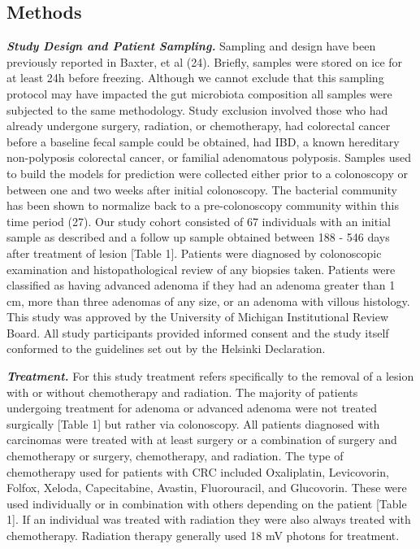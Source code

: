 \documentclass[12pt,]{article}
\begin{document}
\newpage

\subsection{Methods}\label{methods}

\textbf{\emph{Study Design and Patient Sampling.}} Sampling and design
have been previously reported in Baxter, et al (24). Briefly, samples
were stored on ice for at least 24h before freezing. Although we cannot
exclude that this sampling protocol may have impacted the gut microbiota
composition all samples were subjected to the same methodology. Study
exclusion involved those who had already undergone surgery, radiation,
or chemotherapy, had colorectal cancer before a baseline fecal sample
could be obtained, had IBD, a known hereditary non-polyposis colorectal
cancer, or familial adenomatous polyposis. Samples used to build the
models for prediction were collected either prior to a colonoscopy or
between one and two weeks after initial colonoscopy. The bacterial
community has been shown to normalize back to a pre-colonoscopy
community within this time period (27). Our study cohort consisted of 67
individuals with an initial sample as described and a follow up sample
obtained between 188 - 546 days after treatment of lesion {[}Table 1{]}.
Patients were diagnosed by colonoscopic examination and
histopathological review of any biopsies taken. Patients were classified
as having advanced adenoma if they had an adenoma greater than 1 cm,
more than three adenomas of any size, or an adenoma with villous
histology. This study was approved by the University of Michigan
Institutional Review Board. All study participants provided informed
consent and the study itself conformed to the guidelines set out by the
Helsinki Declaration.

\textbf{\emph{Treatment.}} For this study treatment refers specifically
to the removal of a lesion with or without chemotherapy and radiation.
The majority of patients undergoing treatment for adenoma or advanced
adenoma were not treated surgically {[}Table 1{]} but rather via
colonoscopy. All patients diagnosed with carcinomas were treated with at
least surgery or a combination of surgery and chemotherapy or surgery,
chemotherapy, and radiation. The type of chemotherapy used for patients
with CRC included Oxaliplatin, Levicovorin, Folfox, Xeloda,
Capecitabine, Avastin, Fluorouracil, and Glucovorin. These were used
individually or in combination with others depending on the patient
{[}Table 1{]}. If an individual was treated with radiation they were
also always treated with chemotherapy. Radiation therapy generally used
18 mV photons for treatment.
\end{document}
